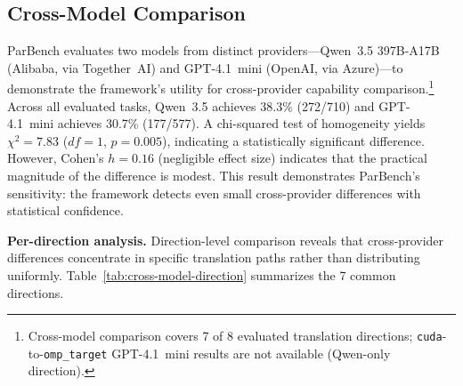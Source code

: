 \documentclass{article}
\begin{document}
\subsection{Cross-Model Comparison}
\label{sec:cross-model}

ParBench evaluates two models from distinct providers---Qwen~3.5 397B-A17B
(Alibaba, via Together~AI) and GPT-4.1~mini (OpenAI, via Azure)---to
demonstrate the framework's utility for cross-provider capability
comparison.\footnote{Cross-model comparison covers 7 of 8 evaluated translation directions; \texttt{cuda}-to-\texttt{omp\_target} GPT-4.1~mini results are not available (Qwen-only direction).}
Across all evaluated tasks, Qwen~3.5 achieves 38.3\% (272/710) and
GPT-4.1~mini achieves 30.7\% (177/577). A chi-squared test of homogeneity
yields $\chi^2 = 7.83$ ($\mathit{df} = 1$, $p = 0.005$),
indicating a statistically significant difference. However, Cohen's $h = 0.16$
(negligible effect size) indicates that the practical magnitude of the
difference is modest. This result demonstrates ParBench's sensitivity: the
framework detects even small cross-provider differences with statistical
confidence.

\textbf{Per-direction analysis.}
Direction-level comparison reveals that cross-provider differences
concentrate in specific translation paths rather than distributing
uniformly. Table~\ref{tab:cross-model-direction} summarizes the 7 common
directions.
\end{document}
